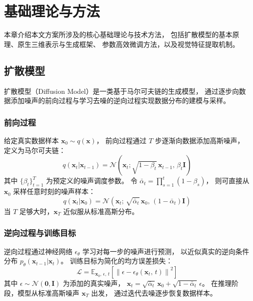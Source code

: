 \cleardoublepage

\section{基础理论与方法}
本章介绍本文方案所涉及的核心基础理论与技术方法，
包括扩散模型的基本原理、原生三维表示与生成框架、
参数高效微调方法，以及视觉特征提取机制。

\subsection{扩散模型}

扩散模型（Diffusion Model）是一类基于马尔可夫链的生成模型，
通过逐步向数据添加噪声的前向过程与学习去噪的逆向过程实现数据分布的建模与采样。

\subsubsection{前向过程}

给定真实数据样本 $\mathbf{x}_0 \sim q(\mathbf{x})$，
前向过程通过 $T$ 步逐渐向数据添加高斯噪声，
定义为马尔可夫链：
\begin{equation}
    q(\mathbf{x}_t | \mathbf{x}_{t-1}) = 
    \mathcal{N}\left(\mathbf{x}_t; \sqrt{1-\beta_t}\,\mathbf{x}_{t-1},\, \beta_t \mathbf{I}\right)
\end{equation}
其中 $\{\beta_t\}_{t=1}^T$ 为预定义的噪声调度参数。
令 $\bar{\alpha}_t = \prod_{s=1}^{t}(1 - \beta_s)$，
则可直接从 $\mathbf{x}_0$ 采样任意时刻的噪声样本：
\begin{equation}
    q(\mathbf{x}_t | \mathbf{x}_0) = 
    \mathcal{N}\left(\mathbf{x}_t;\, \sqrt{\bar{\alpha}_t}\,\mathbf{x}_0,\, (1-\bar{\alpha}_t)\mathbf{I}\right)
\end{equation}
当 $T$ 足够大时，$\mathbf{x}_T$ 近似服从标准高斯分布。

\subsubsection{逆向过程与训练目标}

逆向过程通过神经网络 $\epsilon_\theta$ 学习对每一步的噪声进行预测，
以近似真实的逆向条件分布 $p_\theta(\mathbf{x}_{t-1}|\mathbf{x}_t)$。
训练目标为简化的均方误差损失\cite{ho2020denoising}：
\begin{equation}
    \mathcal{L} = \mathbb{E}_{\mathbf{x}_0,\,\epsilon,\,t}\left[
        \left\| \epsilon - \epsilon_\theta\!\left(\mathbf{x}_t,\, t\right) \right\|^2
    \right]
\end{equation}
其中 $\epsilon \sim \mathcal{N}(\mathbf{0}, \mathbf{I})$ 为添加的真实噪声，
$\mathbf{x}_t = \sqrt{\bar{\alpha}_t}\,\mathbf{x}_0 + \sqrt{1-\bar{\alpha}_t}\,\epsilon$。
在推理阶段，模型从标准高斯噪声 $\mathbf{x}_T$ 出发，
通过迭代去噪逐步恢复数据样本。


